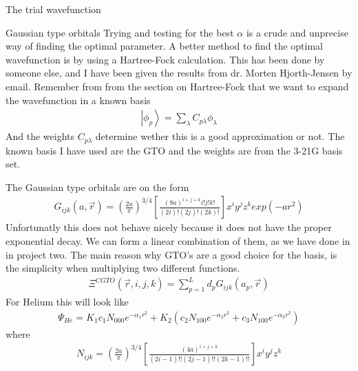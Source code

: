 \documentclass[a4paper, 12pt, titlepage]{article}
\begin{document}
\begin{section}{The trial wavefunction}
 \begin{subsection}{Gaussian type orbitals}
  Trying and testing for the best $\alpha$ is a crude and unprecise way of finding the optimal parameter. A better method to find the optimal wavefunction is by using a Hartree-Fock calculation. This has been done by someone else, and I have been given the results from dr. Morten Hjorth-Jensen by email. Remember from from the section on Hartree-Fock that we want to expand the wavefunction in a known basis 
  \begin{align*}
 		\left| \phi_p \right> = \sum_\lambda C_{p \lambda} \phi_ \lambda
 	\end{align*}
  And the weights $C_{p \lambda}$ determine wether this is a good approximation or not. The known basis I have used are the GTO and the weights are from the 3-21G basis set. 

  The Gaussian type orbitals are on the form
  \begin{align}
  	G_{ijk}(a,\vec r) = \left( \frac{2a}{\pi}	\right)^{3/4} \left[ \frac{(8a)^{i+j+k} i! j! k! }{(2i)!(2j)!(2k)!} \right] x^i y^j z^k exp(-a r^2)
  \end{align}
  Unfortunatly this does not behave nicely because it does not have the proper exponential decay. We can form a linear combination of them, as we have done in in project two. The main reason why GTO's are a good choice for the basis, is the simplicity when multiplying two different functions. 
  \begin{align}
  	\Xi^{CGTO}(\vec r,i,j,k) = \sum_{p=1}^L d_p G_{ijk}(a_p, \vec r)
  \end{align}
  For Helium this will look like 
  	\begin{align}
  	 \Psi_{He} = K_1 c_1 N_{000} e^{-\alpha_1 r^2} + K_2 \left( c_2 N_{100} e^{-\alpha_2 r^2} + c_3 N_{100} e^{-\alpha_3 r^2} \right)
  	\end{align}
  	where 
  	\begin{align}
  		N_{ijk} = \left( \frac{2a}{\pi}	\right)^{3/4} \left[ \frac{(4a)^{i+j+k} }{(2i-1)!!(2j-1)!!(2k-1)!!} \right] x^i y^j z^k 
  	\end{align}


\end{subsection}
\end{section}
\end{document}
